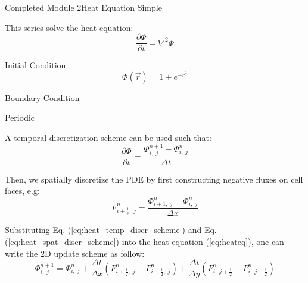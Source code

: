 \documentclass[\string~/GitHub/sthlmNordBeamerTheme/sthlmNordLightDemo.tex]{subfiles}
\begin{document}
\begin{frame}{Completed Module 2}{Heat Equation Simple}

	\prob This series solve the heat equation:
            \begin{equation}
                \frac{\partial \Phi}{\partial t} = \nabla^2 \Phi
                \label{eq:heateq}
            \end{equation}
        
            \begin{exampleblock}{Initial Condition}
                \[
                    \Phi(\Vec{r}) = 1 + e^{-r^2}
                \]
            \end{exampleblock}

            \begin{alertblock}{Boundary Condition}
                \begin{center}
                    Periodic    
                \end{center}
            \end{alertblock}

        \framebreak

        \soln A temporal discretization scheme can be used such that:
            \begin{equation}
                \frac{\partial \Phi}{\partial t} = \frac{\Phi^{n+1}_{i, \; j} - \Phi^{n}_{i, \; j}}{\Delta t}
                \label{eq:heat_temp_discr_scheme}
            \end{equation}

            Then, we spatially discretize the PDE by first constructing negative fluxes on cell faces, e.g:
            \begin{equation}
                F^{n}_{i+\frac{1}{2}, \; j} = \frac{\Phi^{n}_{i+1, \; j} - \Phi^{n}_{i, \; j}}{\Delta x}
                \label{eq:heat_spat_discr_scheme}
            \end{equation}

            Substituting Eq. (\ref{eq:heat_temp_discr_scheme}) and Eq. (\ref{eq:heat_spat_discr_scheme}) into the heat equation (\ref{eq:heateq}), one can write the 2D update scheme as follow:
            \begin{equation}
                \Phi^{n+1}_{i, \; j} = \Phi^{n}_{i, \; j} + \frac{\Delta t}{\Delta x} \left( F^{n}_{i+\frac{1}{2}, \; j} - F^{n}_{i-\frac{1}{2}, \; j} \right) + \frac{\Delta t}{\Delta y} \left( F^{n}_{i, \; j+\frac{1}{2}} - F^{n}_{i, \; j-\frac{1}{2}} \right)
            \end{equation}

\end{frame}
\end{document}
